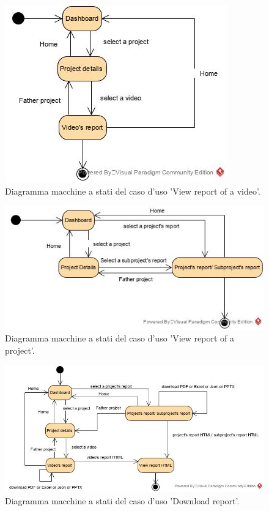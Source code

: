 \begin{figure}[H]
	\centering
	\caption{Diagramma macchine a stati del caso d'uso 'View report of a 
	video'.}
	\label{fig:diagramma-macchine-stati:view-report-video}
	\includegraphics[width=\textwidth]{images/diagramma-macchine-stati/view-report-video}
\end{figure}

\begin{figure}[H]
	\centering
	\caption{Diagramma macchine a stati del caso d'uso 'View report of a 
	project'.}
	\label{fig:diagramma-macchine-stati:view-report-project}
	\includegraphics[width=\textwidth]{images/diagramma-macchine-stati/view-report-project}
\end{figure}

\begin{figure}[H]
	\centering
	\caption{Diagramma macchine a stati del caso d'uso 'Download report'.}
	\label{fig:diagramma-macchine-stati:download-report}
	\includegraphics[width=\textwidth]{images/diagramma-macchine-stati/download-report}
\end{figure}
